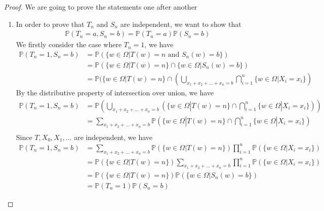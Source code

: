\begin{proof}
  We are going to prove the statements one after another
  \begin{enumerate}[label=(\roman*)]
    \item In order to prove that $T_{n}$ and $S_{n}$ are independent, we want to show that
      \begin{align*}
        \mathbb{P}(T_{n}=a, S_{n}=b) = \mathbb{P}(T_{n}=a) \mathbb{P}(S_{n}=b) \tag{4.1}
      \end{align*}
      We firstly consider the case where $T_{n}=1$, we have
      \begin{align*}
        \mathbb{P}(T_{n}=1, S_{n}=b) &= \mathbb{P}(\{w \in \Omega | T(w) = n \text{ and } S_{n}(w) = b\}) \\
                                     &= \mathbb{P}(\{w \in \Omega | T(w) = n\} \cap \{w \in \Omega | S_{n}(w) = b\}) \\
                                     &= \mathbb{P}(\{w \in \Omega | T(w) = n\} \cap (\bigcup_{x_{1} + x_{2} + \ldots + x_{n}=b} \bigcap_{i=1}^{n} \{w \in \Omega|X_{i} = x_{i}\})
      \end{align*}
      By the distributive property of intersection over union, we have
      \begin{align*}
        \mathbb{P}(T_{n}=1, S_{n}=b) &= \mathbb{P}(\bigcup_{x_{1} + x_{2} + \ldots + x_{n} = b} (\{w \in \Omega|T(w) = n\} \cap \bigcap_{i=1}^{n} \{w \in \Omega|X_{i}=x_{i}\})) \\
                                     &= \sum_{x_{1} + x_{2} + \ldots + x_{n} = b} \mathbb{P}(\{w \in \Omega|T(w) = n\} \cap \bigcap_{i=1}^{n} \{w \in \Omega|X_{i}=x_{i}\}) \\
      \end{align*}
      Since $T, X_{0}, X_{1}, \ldots$ are independent, we have
      \begin{align*}
        \mathbb{P}(T_{n}=1, S_{n}=b) &= \sum_{x_{1} + x_{2} + \ldots + x_{n} = b} \mathbb{P}(\{w \in \Omega|T(w) = n\}) \prod_{i=1}^{n} \mathbb{P}(\{w \in \Omega|X_{i}=x_{i}\}) \\
                                     &= \mathbb{P}(\{w \in \Omega|T(w) = n\}) \sum_{x_{1} + x_{2} + \ldots + x_{n} = b} \prod_{i=1}^{n} \mathbb{P}(\{w \in \Omega|X_{i}=x_{i}\}) \\
                                     &= \mathbb{P}(\{w \in \Omega|T(w) = n\}) \mathbb{P}(\{w \in \Omega|S_{n}(w) = b\}) \\
                                     &= \mathbb{P}(T_{n}=1) \mathbb{P}(S_{n}=b)

\end{align*}
\end{enumerate}
\end{proof}
